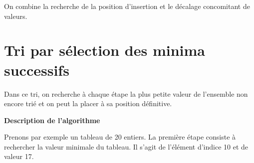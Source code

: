 	On combine la recherche de la position d’insertion et le décalage
	concomitant de valeurs.


	\bigskip


\section{Tri par sélection des minima successifs}
	
	Dans ce tri, on recherche à chaque étape la plus petite valeur de
	l’ensemble non encore trié et on peut la placer à sa position
	définitive.

	{\sffamily\bfseries\upshape
	Description de l’algorithme}

	Prenons par exemple un tableau de 20 entiers. La première étape consiste
	à rechercher la valeur minimale du tableau. Il s’agit de l’élément
	d’indice 10 et de valeur 17.
	
